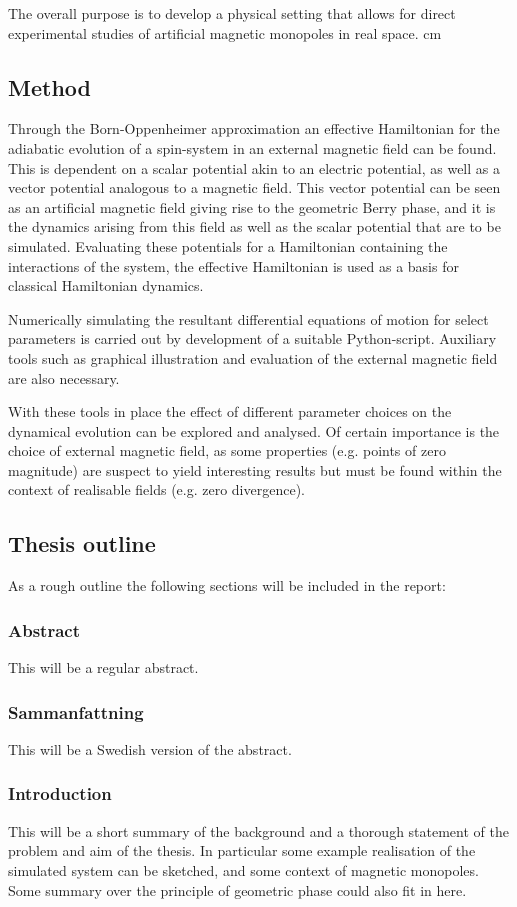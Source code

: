\documentclass [a4paper]{article}
\begin{document}
The overall purpose is to develop a physical setting that allows for direct experimental studies 
of artificial magnetic monopoles in real space. 
 cm
\subsection*{Method}
Through the Born-Oppenheimer approximation an effective Hamiltonian for the adiabatic
evolution of a spin-system in an external magnetic field can be found. This is dependent on a
scalar potential akin to an electric potential, as well as a vector potential analogous to a
magnetic field\cite{berrylim90}.%
This vector potential can be seen as an artificial magnetic field giving rise to the
geometric Berry phase, and it is the dynamics arising from this field as well as the scalar
potential that are to be simulated. Evaluating these potentials for a Hamiltonian
containing the interactions of the system, the effective Hamiltonian is used as a
basis for classical Hamiltonian dynamics. 

Numerically simulating the resultant differential equations of motion for select parameters
is carried out by development of a suitable Python-script. Auxiliary tools such
as graphical illustration and evaluation of the external magnetic field are also necessary.

With these tools in place the effect of different parameter choices on the dynamical
evolution can be explored and analysed. Of certain importance is the choice of external magnetic
field, as some properties (e.g. points of zero magnitude) are suspect to yield interesting
results but must be found within the context of realisable fields (e.g. zero divergence).

\subsection*{Thesis outline}
As a rough outline the following sections will be included in the report:
\subsubsection*{Abstract}
This will be a regular abstract.
\subsubsection*{Sammanfattning}
This will be a Swedish version of the abstract.
\subsubsection*{Introduction}
This will be a short summary of the background and a thorough statement of the problem and
aim of the thesis. In particular some example realisation of the simulated system can be
sketched, and some context of magnetic monopoles. Some summary over the principle of geometric
phase could also fit in here.
\end{document}
